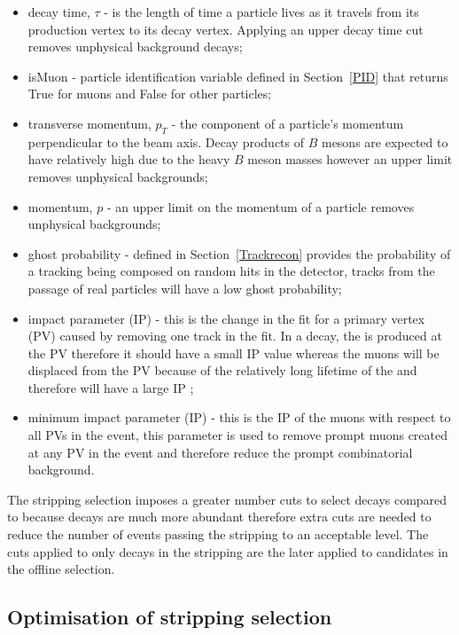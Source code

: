 \begin{itemize}
\item decay time, $\tau$ - is the length of time a particle lives as it travels from its production vertex to its decay vertex. Applying an upper decay time cut removes unphysical background decays;
\item isMuon - particle identification variable defined in Section~\ref{PID} that returns True for muons and False for other particles;
\item transverse momentum, $p_{T}$ - the component of a particle's momentum perpendicular to the beam axis. Decay products of $B$ mesons are expected to have relatively high \pt due to the heavy $B$ meson masses however an upper limit removes unphysical backgrounds;
\item momentum, $p$ - an upper limit on the momentum of a particle  removes unphysical backgrounds;
\item ghost probability - defined in Section~\ref{Trackrecon} provides the probability of a tracking being composed on random hits in the detector, tracks from the passage of real particles will have a low ghost probability; 
\item impact parameter (IP) \chisqd $ $- this is the change in the fit for a primary vertex (PV) caused by removing one track in the fit. In a \bsmumu decay, the \bs is produced at the PV therefore it should have a small IP \chisqd value whereas the muons will be displaced from the PV because of the relatively long lifetime of the \bs and therefore will have a large IP \chisqd;
\item minimum impact parameter (IP) \chisqd $ $- this is the IP \chisqd of the muons with respect to all PVs in the event, this parameter is used to remove prompt muons created at any PV in the event and therefore reduce the prompt combinatorial background. 
\end{itemize}

The stripping selection imposes a greater number cuts to select \bhh decays compared to \bsmumu because \bhh decays are much more abundant therefore extra cuts are needed to reduce the number of events passing the stripping to an acceptable level. The cuts applied to only \bhh decays in the stripping are the later applied to \bsmumu candidates in the offline selection. %


\subsection{Optimisation of \bsmumu stripping selection}
\label{strippingstudies}


